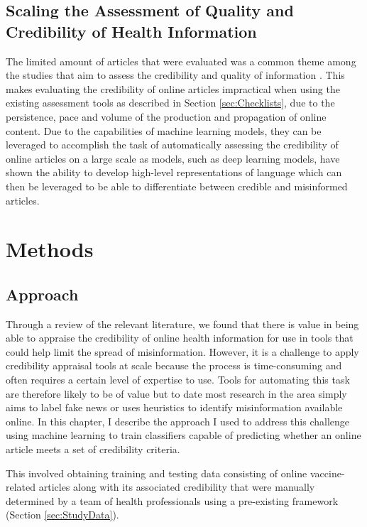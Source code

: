 \documentclass[a4paper,twoside,phd]{BYUPhys}
\begin{document}
\section{Scaling the Assessment of Quality and Credibility of Health Information}
\label{sec:ScalingAssessment}

The limited amount of articles that were evaluated was a common theme among the studies that aim to assess the credibility and quality of information \cite{CanteyBanasiak2017} \cite{Cipriani} \cite{Kaicker2010} \cite{Som2012} \cite{Batchelor2009}.
This makes evaluating the credibility of online articles impractical when using the existing assessment tools as described in Section \ref{sec:Checklists}, due to the persistence, pace and volume of the production and propagation of online content. Due to the capabilities of machine learning models, they can be leveraged to accomplish the task of automatically assessing the credibility of online articles on a large scale as models, such as deep learning models, have shown the ability to develop high-level representations of language which can then be leveraged to be able to differentiate between credible and misinformed articles.


\chapter{Methods}
\label{chap:Methods}

\section{Approach}
\label{sec:Approach}

Through a review of the relevant literature, we found that there is value in being able to appraise the credibility of online health information for use in tools that could help limit the spread of misinformation. However, it is a challenge to apply credibility appraisal tools at scale because the process is time-consuming and often requires a certain level of expertise to use. Tools for automating this task are therefore likely to be of value but to date most research in the area simply aims to label fake news or uses heuristics to identify misinformation available online. In this chapter, I describe the approach I used to address this challenge using machine learning to train classifiers capable of predicting whether an online article meets a set of credibility criteria.\newline

This involved obtaining training and testing data consisting of online vaccine-related articles along with its associated credibility that were manually determined by a team of health professionals using a pre-existing framework (Section \ref{sec:StudyData}). \newline
\end{document}
